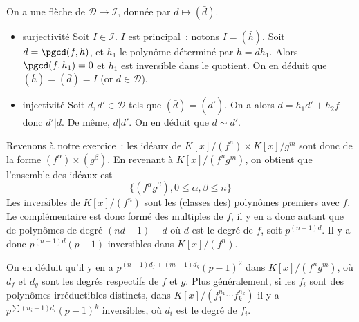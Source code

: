 {\begin{enumerate}
{   On a une flèche de $\mathcal{D}\to\mathcal{I}$, donnée par
   $d\mapsto(\bar{d})$.
   \begin{itemize}
\item surjectivité
     Soit $I\in\mathcal{I}$. $I$ est principal~: notons $I=(\bar{h})$.
     Soit $d=\pgcd(f,h)$, et $h_{1}$ le polynôme déterminé par
     $h=dh_{1}$. Alors $\pgcd(f,h_{1})=0$ et $h_{1}$ est inversible dans
     le quotient. On en déduit que $(\bar{h})=(\bar{d})=I$ (or $d\in\mathcal{D}$).
\item injectivité
     Soit $d,d'\in\mathcal{D}$ tels que $(\bar{d})=(\bar{d'})$. On a
     alors $d=h_{1}d'+h_{2}f$ donc $d'|d$. De même, $d|d'$. On en déduit
     que $d\sim d'$.
   \end{itemize}

   \smallskip
   
   Revenons à notre exercice~: les idéaux de $K[x]/(f^{n})\times
   K[x]/g^{m}$ sont donc de la forme $(f^{\alpha})\times(g^{\beta})$. En
   revenant à $K[x]/(f^{n}g^{m})$, on obtient que l'ensemble des idéaux
   est $$\{(f^{\alpha}g^{\beta}), 0\leq\alpha,\beta\leq n\}$$
Les inversibles de $K[x]/(f^{n})$ sont les (classes des) polynômes
   premiers avec $f$. Le complémentaire est donc formé des multiples de
   $f$, il y en a donc autant que de polynômes de degré $(nd-1)-d$ où $d$
   est le degré de $f$, soit $p^{(n-1)d}$. Il y a donc $p^{(n-1)d}(p-1)$
   inversibles dans $K[x]/(f^{n})$.

   On en déduit qu'il y en a $p^{(n-1)d_{f}+(m-1)d_{g}}(p-1)^{2}$ dans
   $K[x]/(f^{n}g^{m})$, où $d_{f}$ et $d_{g}$ sont les degrés respectifs
   de $f$ et $g$.
Plus généralement, si les $f_{i}$ sont des polynômes irréductibles
   distincts, dans $K[x]/(f_{1}^{n_{1}}\cdots f_{k}^{n_{k}})$ il y a
   $p^{\sum (n_{i}-1)d_{i}}(p-1)^{k}$ inversibles, où $d_{i}$ est le
   degré de $f_{i}$.
}
\end{enumerate}
}
